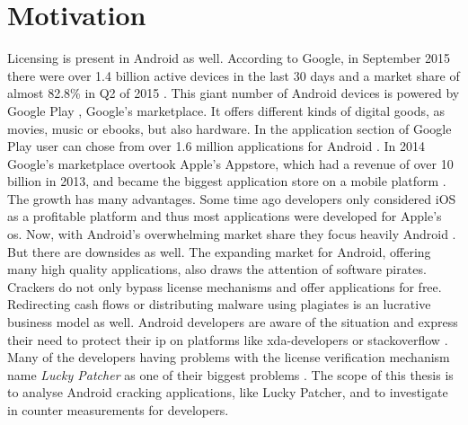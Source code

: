 \section{Motivation}\label{subsection:introduction-motivation}
Licensing is present in Android as well.
According to Google, in September 2015 there were over 1.4 billion active devices in the last 30 days and a market share of almost 82.8\% in Q2 of 2015 \cite{androidDevices}\cite{androidShare}.
This giant number of Android devices is powered by Google Play \cite{googlePlay}, Google's marketplace.
It offers different kinds of digital goods, as movies, music or ebooks, but also hardware.
In the application section of Google Play user can chose from over 1.6 million applications for Android \cite{statistaAppStore}.
In 2014 Google's marketplace overtook Apple's Appstore, which had a revenue of over 10 billion in 2013, and became the biggest application store on a mobile platform \cite{wiwoValue}.
\newline
The growth has many advantages.
Some time ago developers only considered iOS as a profitable platform and thus most applications were developed for Apple's \gls{os}.
Now, with Android's overwhelming market share they focus heavily Android \cite{businessProfit}.
But there are downsides as well.
The expanding market for Android, offering many high quality applications, also draws the attention of software pirates.
Crackers do not only bypass license mechanisms and offer applications for free.
Redirecting cash flows or distributing malware using plagiates is an lucrative business model as well.
Android developers are aware of the situation \cite{developersPiracy} and express their need to protect their \gls{ip} on platforms like xda-developers \cite{xdaPiracy} or stackoverflow \cite{stackoverflowPiracy}.
Many of the developers having problems with the license verification mechanism name \textit{Lucky Patcher} as one of their biggest problems \cite{stackoverflowLucky}.
\newline
\newline
The scope of this thesis is to analyse Android cracking applications, like Lucky Patcher,  and to investigate in counter measurements for developers.

